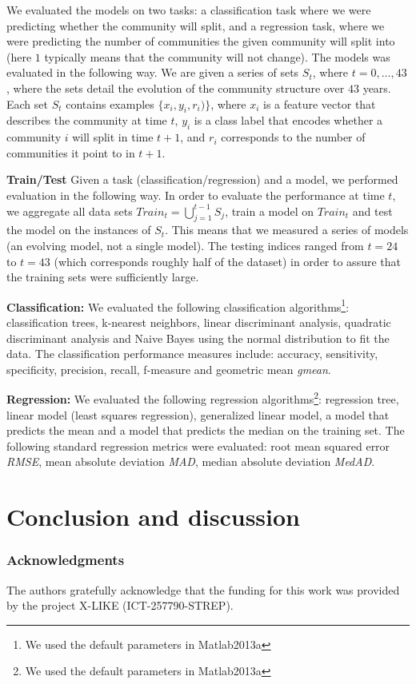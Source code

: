 \documentclass{article} %
\begin{document}
We evaluated the models on two tasks: a classification task where we
were predicting whether the community will split, and a regression
task, where we were predicting
the number of communities the given community will split into (here
$1$ typically means that the community will not change).
The models was evaluated in the following way. We are given a series
of sets $S_t$, where $t = 0,\ldots, 43$, where the sets detail the
evolution of the community structure over $43$ years. Each set $S_t$
contains examples $\{x_i, y_i, r_i)\}$, where $x_i$ is a feature
vector that describes the community at time $t$, $y_i$ is a class
label that encodes whether a community $i$ will split in time $t+1$,
and $r_i$ corresponds to the number of communities it point to in
$t+1$.

\textbf{Train/Test} Given a task (classification/regression) and a
model, we performed evaluation in the following way. In order to
evaluate the performance at time $t$, we aggregate
all data sets $Train_t = \bigcup_{j=1}^{t-1}{S_j}$, train a model on
$Train_t$ and test the model on the instances of $S_t$. This means
that we measured a series of models (an evolving model, not a single
model). The testing indices ranged from $t = 24$ to $t = 43$ (which
corresponds roughly half of the dataset) in order to assure that the
training sets were sufficiently large.

\textbf{Classification:}
We evaluated the following classification algorithms\footnote{We used
the default parameters in Matlab2013a}: classification trees,
k-nearest neighbors, linear discriminant analysis, quadratic
discriminant analysis and Naive Bayes using the normal distribution to
fit the data.
The classification performance measures include: accuracy,
sensitivity, specificity, precision, recall, f-measure and geometric
mean \emph{gmean}.

\textbf{Regression:} We evaluated the following regression
algorithms\footnote{We used the default parameters in Matlab2013a}:
regression tree, linear model (least squares regression), generalized
linear model, a model that predicts the mean and a model that predicts
the median on the training set.
The following standard regression metrics were evaluated: root mean
squared error \emph{RMSE}, mean absolute deviation \emph{MAD}, median
absolute deviation \emph{MedAD}.

\section{Conclusion and discussion}

\subsubsection*{Acknowledgments}
   The authors gratefully acknowledge that the funding for this work was provided by the project X-LIKE (ICT-257790-STREP)\cite{xlike}.




\end{document}
